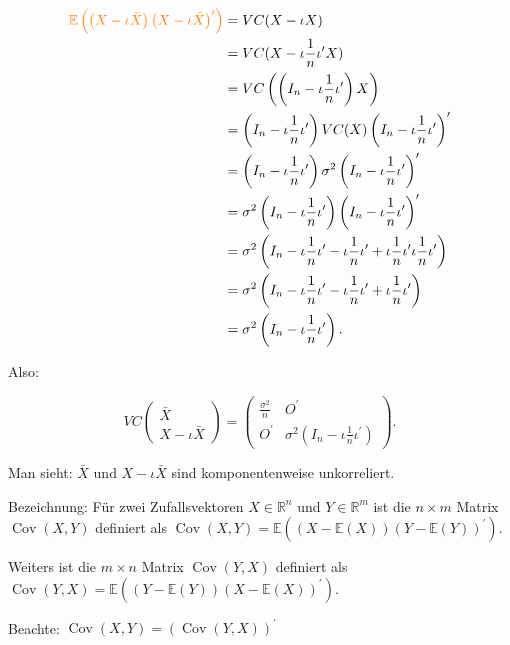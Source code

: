 \documentclass{tstextbook}
\DeclareMathOperator{\Cov}{Cov}
\begin{document}
\begin{example}
\begin{align*}
	\textcolor{orange}{\mathbb{E}\left(\left(X-\iota\bar{X}\right)\left(X-\iota\bar{X}\right)^{\prime}\right)} & =VC(X-\iota X)\\
	& =VC(X-\iota\frac{1}{n}\iota^{\prime}X)\\
	& =VC\left(\left(I_{n}-\iota\frac{1}{n}\iota^{\prime}\right)X\right)\\
	& =\left(I_{n}-\iota\frac{1}{n}\iota^{\prime}\right)VC(X)\left(I_{n}-\iota\frac{1}{n}\iota^{\prime}\right)^{\prime}\\
	& =\left(I_{n}-\iota\frac{1}{n}\iota^{\prime}\right)\sigma^{2}\left(I_{n}-\iota\frac{1}{n}\iota^{\prime}\right)^{\prime}\\
	& =\sigma^{2}\left(I_{n}-\iota\frac{1}{n}\iota^{\prime}\right)\left(I_{n}-\iota\frac{1}{n}\iota^{\prime}\right)^{\prime}\\
	& =\sigma^{2}\left(I_{n}-\iota\frac{1}{n}\iota^{\prime}-\iota\frac{1}{n}\iota^{\prime}+\iota\frac{1}{n}\iota^{\prime}\iota\frac{1}{n}\iota^{\prime}\right)\\
	& =\sigma^{2}\left(I_{n}-\iota\frac{1}{n}\iota^{\prime}-\iota\frac{1}{n}\iota^{\prime}+\iota\frac{1}{n}\iota^{\prime}\right)\\
	& =\sigma^{2}\left(I_{n}-\iota\frac{1}{n}\iota^{\prime}\right).
\end{align*}

Also:

\[
VC\begin{pmatrix}
	\bar{X} \\ X-\iota\bar{X}
\end{pmatrix}=\begin{pmatrix}\frac{\sigma^{2}}{n} & O^{\prime}\\
	O^{\prime} & \sigma^{2}\left(I_{n}-\iota\frac{1}{n}\iota^{\prime}\right)
\end{pmatrix}.
\]

Man sieht: $ \bar{X} $ und $ X-\iota\bar{X} $ sind komponentenweise unkorreliert.

\end{example}

\begin{remark}
	Bezeichnung:
Für zwei Zufallsvektoren $ X\in\mathbb{R}^n $ und $ Y\in\mathbb{R}^m $ ist die $ n\times m $ Matrix $ \Cov(X,Y) $ definiert als $ \Cov(X,Y)=\mathbb{E}((X-\mathbb{E}(X))(Y-\mathbb{E}(Y))^\prime). $

Weiters ist die $ m\times n $ Matrix $ \Cov(Y,X) $ definiert als $ \Cov(Y,X)=\mathbb{E}((Y-\mathbb{E}(Y))(X-\mathbb{E}(X))^\prime). $

Beachte: $ \Cov(X,Y) = (\Cov(Y,X))^\prime $
\end{remark}
\end{document}
